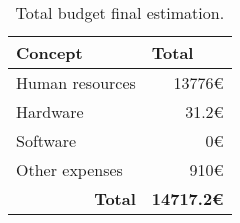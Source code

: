 \begin{table}[h]
	\centering
	\begin{tabular}{lr}
		\hline
		\textbf{Concept} & \multicolumn{1}{l}{\textbf{Total}} \\ \hline
		Human resources & 13776€ \\
		Hardware & 31.2€ \\
		Software & 0€ \\
		Other expenses & 910€ \\ \hline
		\multicolumn{1}{r}{\textbf{Total}} & \multicolumn{1}{l}{\textbf{14717.2€}}
	\end{tabular}
	\caption{Total budget final estimation.}
	\label{table:final-total-resources}
\end{table}